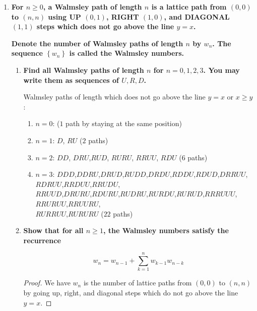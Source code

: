 \documentclass[10pt]{article}
\begin{document}
\begin{enumerate}
\begin{align*}
    S_n=a_n-b_n &= \frac{1}{32} \left(10^n+ 5\times 8^n+10 \times 6^n+10\times 4^n+5\times 2^n\right) - \frac{1}{32} \left(\frac{10^n}{10}+ 3\times \frac{8^n}{8}+2\times \frac{6^n}{6}-2\times \frac{4^n}{4} - 3 \times \frac{2^n}{2}\right) \\
    &=\frac{1}{32} \left(\frac{9\times 10^n}{10} + \frac{37\times8^n}{8}+\frac{29\times6^n}{3}+\frac{21\times 4^n}{2} + \frac{13\times 2^n}{2}\right) \quad (n \geq 2)
\end{align*}
\vskip 1cm


\item 
\textbf{For $n\geq 0$, a Walmsley path of length $n$ is a lattice path from $(0,0)$ to $(n,n)$ using UP $(0,1)$,
RIGHT $(1,0)$, and DIAGONAL $(1,1)$ steps which does not go above the line $y= x$.}

\textbf{Denote the number of Walmsley paths of length $n$ by $w_n$.  The sequence $\left\{w_n\right\}$ is called the Walmsley numbers.}
\begin{enumerate}
\item
\textbf{Find all Walmsley paths of length $n$ for $n=0,1,2,3$.  You may write them as sequences of $U,R,D$.}

Walmsley paths of length which does not go above the line $y=x$ or $x \geq y$:
\begin{enumerate}
    \item $n=0$: ($1$ path by staying at the same position)
    \item $n=1$: $D$, $RU$ ($2$ paths)
    \item $n=2$: $DD$, $DRU$,$RUD$, $RURU$, $RRUU$, $RDU$ ($6$ paths) 
    \item$n=3$: $DDD$,$DDRU$,$DRUD$,$RUDD$,$DRDU$,$RDDU$,$RDUD$,$DRRUU$,$RDRUU$,$RRDUU$,$RRUDU$,\\$RRUUD$,$DRURU$,$RDURU$,$RUDRU$,$RURDU$,$RURUD$,$RRRUUU$,$RRURUU$,$RRUURU$,\\$RURRUU$,$RURURU$ ($22$ paths)
\end{enumerate}
\item
\textbf{Show that for all $n\geq 1$, the Walmsley numbers satisfy the recurrence}

$$w_n = w_{n-1} +\sum\limits_{k=1}^n w_{k-1}w_{n-k}$$

\begin{proof}
    We have $w_n$ is the number of lattice paths from $(0,0)$ to $(n,n)$ by going up, right, and diagonal steps which do not go above the line $y=x$.


\end{proof}
\end{enumerate}
\end{enumerate}
\end{document}
